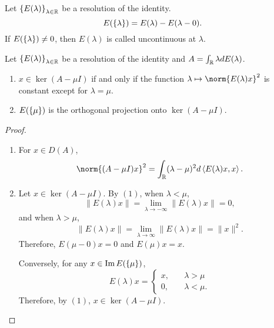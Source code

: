 \documentclass[a4paper,12pt]{article}
\begin{document}
\begin{defn}
    Let $\left\{E(\lambda)\right\}_{\lambda \in \mathbb{R}}$ be a resolution of the identity.
    \begin{equation*}
        E(\left\{\lambda\right\}) = E(\lambda) - E(\lambda - 0).
    \end{equation*}
    If $E(\left\{\lambda\right\}) \neq 0$, then $E(\lambda)$ is called uncontinuous at $\lambda$.
\end{defn}

\begin{prop}
    Let $\left\{E(\lambda)\right\}_{\lambda \in \mathbb{R}}$ be a resolution of the identity and $A = \int_{\mathbb{R}} \lambda dE(\lambda)$.
    \begin{enumerate}[label=(\arabic{*})]
        \item $x \in \ker (A - \mu I)$ if and only if the function $\lambda \mapsto \norm{E(\lambda)x}^2$ is constant except for $\lambda = \mu$.
        \item $E(\left\{\mu\right\})$ is the orthogonal projection onto $\ker (A - \mu I)$.
    \end{enumerate}
\end{prop}
\begin{proof}
    \begin{enumerate}[label=(\arabic{*})]
        \item For $x \in D(A)$,
        \begin{equation*}
            \norm{(A - \mu I)x}^2 = \int_{\R} (\lambda - \mu)^2 d \inn{E(\lambda)x,x}.
        \end{equation*}

        \item Let $x \in \ker (A - \mu I)$. By $(1)$, when $\lambda < \mu$,
        \begin{equation*}
            \|E(\lambda) x\|=\lim _{\lambda \rightarrow-\infty}\|E(\lambda) x\|=0,
        \end{equation*}
        and when $\lambda > \mu$, 
        \begin{equation*}
            \|E(\lambda) x\|=\lim _{\lambda \rightarrow \infty}\|E(\lambda) x\|=\|x\|^2.
        \end{equation*}
        Therefore, $E(\mu-0) x=0$ and $E(\mu) x=x$.

        Conversely, for any $x \in \operatorname{Im} E(\left\{\mu\right\})$,
        \begin{equation*}
            E(\lambda)x = \left\{
                \begin{aligned}
                    x,&\quad \lambda > \mu \\
                    0,&\quad \lambda < \mu.
                \end{aligned}
            \right.
        \end{equation*}
        Therefore, by $(1)$, $x \in \ker (A - \mu I)$.
    \end{enumerate}
\end{proof}
\end{document}
